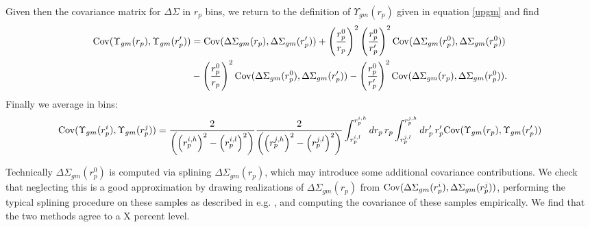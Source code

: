 \documentclass[onecolumn,amsmath,aps,fleqn, superscriptaddress]{revtex4}
\begin{document}
Given then the covariance matrix for $\Delta \Sigma$ in $r_p$ bins, we return to the definition of $\Upsilon_{gm}(r_p)$ given in equation \ref{upgm} and find
\begin{align}
{\rm Cov}(\Upsilon_{gm}(r_p),\Upsilon_{gm}(r_p^\prime)) &= {\rm Cov}(\Delta \Sigma_{gm}(r_p),\Delta \Sigma_{gm}(r_p^\prime)) + \left(\frac{r_p^0}{r_p}\right)^2 \left(\frac{r_p^0}{r_p^\prime}\right)^2 {\rm Cov}(\Delta \Sigma_{gm}(r_p^0),\Delta \Sigma_{gm}(r_p^0)) \nonumber \\ &-\left(\frac{r_p^0}{r_p}\right)^2  {\rm Cov}(\Delta \Sigma_{gm}(r_p^0),\Delta \Sigma_{gm}(r_p^\prime))-\left(\frac{r_p^0}{r_p^\prime}\right)^2  {\rm Cov}(\Delta \Sigma_{gm}(r_p),\Delta \Sigma_{gm}(r_p^0)).
\label{covupgm}
\end{align}
Finally we average in bins:
\begin{align}
{\rm Cov}(\Upsilon_{gm}(r_p^i), \Upsilon_{gm}(r_p^j)) = \frac{2}{\left(\left(r_p^{i,h}\right)^2-\left(r_p^{i,l}\right)^2 \right)} \frac{2}{\left(\left(r_p^{j,h}\right)^2-\left(r_p^{j,l}\right)^2\right) } \int_{r_p^{i,l}}^{r_p^{i,h}} dr_p \, r_p \int_{r_p^{j,l}}^{r_p^{j,h}} dr_p^\prime \, r_p^\prime {\rm Cov}(\Upsilon_{gm}(r_p),\Upsilon_{gm}(r_p^\prime))
\label{covupgm_binned}
\end{align}


Technically $\Delta \Sigma_{gm}(r_p^0)$ is computed via splining $\Delta \Sigma_{gm}(r_p)$, which may introduce some additional covariance contributions. We check that neglecting this is a good approximation by drawing realizations of $\Delta \Sigma_{gm}(r_p)$ from ${\rm Cov}(\Delta \Sigma_{gm}(r_p^i),\Delta \Sigma_{gm}(r_p^j))$, performing the typical splining procedure on these samples as described in e.g. \cite{Blake2015}, and computing the covariance of these samples empirically. We find that the two methods agree to a X percent level.

\vspace{2mm}
\end{document}
